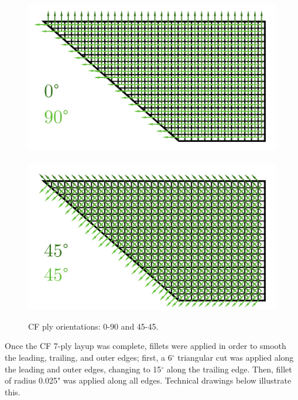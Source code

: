 \documentclass{amsdtx}
\begin{document}
\begin{figure}[H]
\centering
\includegraphics[scale=0.17]{0p90.pdf}~~~~~~~~
\includegraphics[scale=0.17]{45p45.pdf}
\caption{CF ply orientations: 0-90 and 45-45.}
\end{figure}
\noindent Once the CF 7-ply layup was complete, fillets were applied in order to smooth the leading, trailing, and outer edges; first, a 6$^\circ$ triangular cut was applied along the leading and outer edges, changing to 15$^\circ$ along the trailing edge. Then, fillet of radius 0.025" was applied along all edges. Technical drawings below illustrate this.
\end{document}
